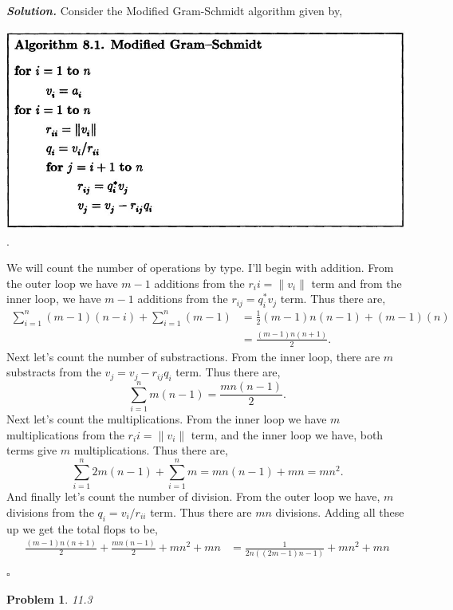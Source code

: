\documentclass[12pt]{report}
\newtheorem{problem}{Problem}
\newenvironment{solution}[1][\it{Solution}]{\textbf{#1. } }{$\square$}
\begin{document}
\begin{solution}
    \noindent
    Consider the Modified Gram-Schmidt algorithm given by,
    \begin{center}
        \includegraphics[width=.4\textwidth]{alg8.1.JPG}.
    \end{center} 
    We will count the number of operations by type. I'll begin with addition. From the outer loop we have $m-1$ additions from the $r_ii = \| v_i \|$ term and from the inner loop, we have $m-1$ additions from the $r_{ij} = q_i^*v_j$ term. Thus there are,
    \begin{align*}
        \sum_{i=1}^n (m-1)(n-i) + \sum_{i=1}^n(m-1) &= \frac{1}{2}(m-1)n(n - 1) + (m-1)(n)\\
        &= \frac{(m-1)n(n+1)}{2}.
    \end{align*} 
    Next let's count the number of substractions. From the inner loop, there are $m$ substracts from the $v_j = v_j - r_{ij}q_i$ term. Thus there are,
    \[
        \sum_{i=1}^n m(n-1) = \frac{mn(n-1)}{2}.
    \]
    Next let's count the multiplications. From the inner loop we have $m$ multiplications from the $r_ii = \| v_i \|$ term, and the inner loop we have, both terms give $m$ multiplications. Thus there are,
    \[ 
        \sum_{i=1}^n 2m(n-1) + \sum_{i=1}^nm = mn(n-1) + mn = mn^2.
    \]
    And finally let's count the number of division. From the outer loop we have, $m$ divisions from the $q_i = v_i/r_{ii}$ term. Thus there are $mn$ divisions. Adding all these up we get the total flops to be,
    \begin{align*}
        \frac{(m-1)n(n+1)}{2} + \frac{mn(n-1)}{2} + mn^2 + mn &= \frac{1}{2 n ((2 m - 1) n - 1)} + mn^2 + mn\\
    \end{align*}
\end{solution}

\newpage



\begin{problem}
    11.3
\end{problem}
\end{document}
